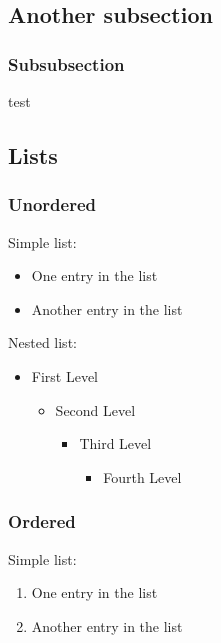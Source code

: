 \documentclass{article}				%
\begin{document}
\subsection{Another subsection}

\subsubsection{Subsubsection}

test

\subsection{Lists}

\subsubsection{Unordered}

Simple list:

\begin{itemize}
	\item One entry in the list
	\item Another entry in the list
\end{itemize}

Nested list:

\begin{itemize}
	\item  First Level
	\begin{itemize}
		\item  Second Level
		\begin{itemize}
			\item  Third Level
			\begin{itemize}
				\item  Fourth Level
			\end{itemize}
		\end{itemize}
	\end{itemize}
\end{itemize}

\subsubsection{Ordered}

Simple list:

\begin{enumerate}
	\item One entry in the list
	\item Another entry in the list
\end{enumerate}
\end{document}
